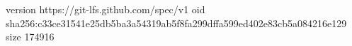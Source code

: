 version https://git-lfs.github.com/spec/v1
oid sha256:c33ce31541e25db5ba3a54319ab5f8fa299dffa599ed402e83cb5a084216e129
size 174916
